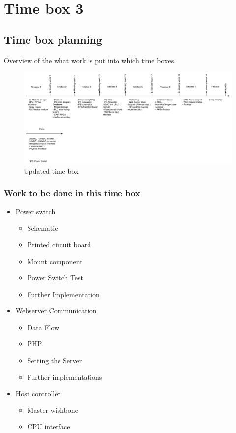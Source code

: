 \section{Time box 3}
\subsection{Time box planning}
Overview of the what work is put into which time boxes.
\begin{figure}[H]
	\begin{centering}
		 \includegraphics[width=1.0\textwidth]{images/tb_r3.pdf}
		\caption{Updated time-box}
	\end{centering}
\end{figure}

\subsubsection{Work to be done in this time box}
\begin{itemize}
	\item Power switch
	\begin{itemize}
		\item Schematic
		\item Printed circuit board
		\item Mount component
		\item Power Switch Test
		\item Further Implementation
	\end{itemize}
	\item{Webserver Communication}
	\begin{itemize}
		\item Data Flow
		\item PHP
		\item Setting the Server
		\item Further implementations
	\end{itemize}
	\item Host controller
	\begin{itemize}
		\item Master wishbone
		\item CPU interface
	\end{itemize}
\end{itemize}
